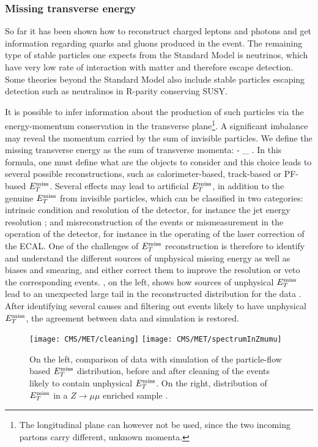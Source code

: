         \subsubsection{Missing transverse energy}

    So far it has been shown how to reconstruct charged leptons and photons and get
    information regarding quarks and gluons produced in the event. The remaining
    type of stable particles one expects from the Standard Model is neutrinos, which
    have very low rate of interaction with matter and therefore escape detection. Some
    theories beyond the Standard Model also include stable particles escaping detection
    such as neutralinos in R-parity conserving SUSY.

    It is possible to infer information about the production
    of such particles via the energy-momentum conservation in the transverse plane\footnote{The
    longitudinal plane can however not be used, since the two incoming partons carry
    different, unknown momenta.}. A significant imbalance may reveal the momentum carried by
    the sum of invisible particles. We define the missing transverse energy as the
    sum of transverse momenta:
    {
        \vec{\MET}  - \sum_{} \vec{\pT}.
    }
    In this formula, one must define what are the objects to consider and this choice
    leads to several possible reconstructions, such as calorimeter-based, track-based
    or PF-based $E_T^\text{miss}$. Several effects may lead to artificial $E_T^\text{miss}$, in addition to the
    genuine $E_T^\text{miss}$ from invisible particles, which can be classified in two categories:
    intrinsic condition and resolution of the detector, for instance the jet energy
    resolution ; and misreconstruction of the events or mismeasurement in the
    operation of the detector, for instance in the operating of the laser correction
    of the ECAL. One of the challenges of $E_T^\text{miss}$ reconstruction is therefore to identify
    and understand the different sources of unphysical missing energy as well as biases and
    smearing, and either correct them to improve the resolution or veto the corresponding
    events.
    , on the left, shows how sources of unphysical $E_T^\text{miss}$
    lead to an unexpected large tail in the reconstructed distribution for the data \cite{METperf}.
    After identifying several causes and filtering out events likely to have unphysical
    $E_T^\text{miss}$, the agreement between data and simulation is restored.

    \begin{figure}[h!]
        \centering
        \texttt{[image: CMS/MET/cleaning]}
        \texttt{[image: CMS/MET/spectrumInZmumu]}
        \caption{On the left, comparison of data with simulation of the
        particle-flow based $E_T^\text{miss}$ distribution, before and after cleaning of the events
        likely to contain unphysical $E_T^\text{miss}$. On the right, distribution of $E_T^\text{miss}$ in
        a $Z \rightarrow \mu\mu$ enriched sample \cite{METperf}. }
        \label{fig:METspectrum}
    \end{figure}

